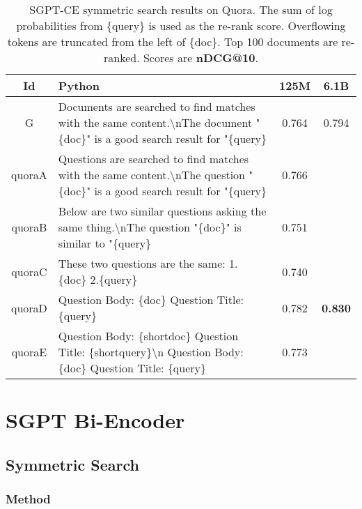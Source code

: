 \documentclass{article}
\begin{document}
\begin{table*}[t]
    \centering
    \small
    \begin{tabular}{c|p{90mm}|c|c}
    \toprule
    Id & Python & 125M & 6.1B
    \\
    \midrule
    G 
    & Documents are searched to find matches with the same content.\textbackslash nThe document "\{doc\}" is a good search result for "\{query\}
    & 0.764
    & 0.794
    \\
    \midrule
    quoraA 
    & Questions are searched to find matches with the same content.\textbackslash nThe question "\{doc\}" is a good search result for "\{query\} 
    & 0.766
    &
    \\
    \midrule
    quoraB 
    & Below are two similar questions asking the same thing.\textbackslash nThe question "\{doc\}" is similar to "\{query\} 
    & 0.751
    &
    \\
    \midrule
    quoraC
    & These two questions are the same: 1. \{doc\} 2.\{query\} 
    & 0.740
    &
    \\ \midrule
    quoraD
    & Question Body: \{doc\} Question Title:\{query\}
    & 0.782
    & \textbf{0.830}
    \\
    \midrule
    quoraE
    & Question Body: \{shortdoc\} Question Title: \{shortquery\}\textbackslash n Question Body: \{doc\} Question Title: \{query\}
    & 0.773
    &
    \\
    \bottomrule
    \end{tabular}
    \caption{SGPT-CE symmetric search results on Quora. The sum of log probabilities from \{query\} is used as the re-rank score. Overflowing tokens are truncated from the left of \{doc\}. Top 100 documents are re-ranked. Scores are \textbf{nDCG@10}.}
    \label{tab:quoraablations}
\end{table*}



\section{SGPT Bi-Encoder}\label{sec:be}


\subsection{Symmetric Search}\label{sec:bisym}


\subsubsection{Method}\label{sec:bisymmeth}
\end{document}
